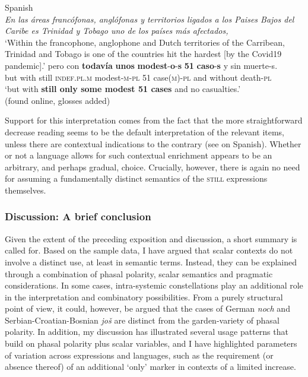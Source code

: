 \begin{exe}
	\ex Spanish\label{exScalarIncreaseTrinidad}\\
	\textit{En las áreas francófonas, anglófonas y territorios ligados a los Paises Bajos del Caribe es Trinidad y Tobago uno de los países más afectados,}\\
	\lq Within the francophone, anglophone and Dutch territories of the Carribean, Trinidad and Tobago is one of the countries hit the hardest [by the Covid19 pandemic].\rq{}
	\exi{}\gll pero con \textbf{todavía} \textbf{unos} \textbf{modest}-\textbf{o}-\textbf{s} \textbf{51} \textbf{caso}-\textbf{s} y sin muerte-s.\\
	 but with still \textsc{indef}.\textsc{pl}.\textsc{m} modest-\textsc{m}-\textsc{pl} 51 case(\textsc{m})-\textsc{pl} and without death-\textsc{pl}\\
	\glt \lq but with \textbf{still only some modest 51 cases} and no casualties.\rq{}\\(found online, glosses added)%
\end{exe}

Support for this interpretation comes from the fact that the more straightforward decrease reading seems to be the default interpretation of the relevant items, unless there are contextual indications to the contrary (see \cite{Garrido1992} on Spanish). Whether or not a language allows for such contextual enrichment  appears to be an arbitrary, and perhaps gradual, choice. Crucially, however, there is again no need for assuming a fundamentally distinct semantics of the \textsc{still} expressions themselves.

\subsubsection{Discussion: A brief conclusion} 
Given the extent of the preceding exposition and discussion, a short summary is called for. Based on the sample data, I have argued that scalar contexts do not involve a distinct use, at least in semantic terms. Instead, they can be explained through a combination of phasal polarity, scalar semantics and pragmatic considerations. In some cases, intra-systemic constellations play an additional role in the interpretation and combinatory possibilities. From a purely structural point of view, it could, however, be argued that the cases of German \textit{noch} and Serbian\hyp Croatian\hyp Bosnian \textit{još} are distinct from the garden-variety of phasal polarity. In addition, my discussion has illustrated several usage patterns that build on phasal polarity plus scalar variables, and I have highlighted parameters of variation across expressions and languages, such as the requirement (or absence thereof) of an additional  \lq only\rq{ }marker in contexts of a limited increase.


